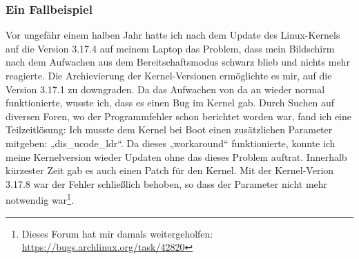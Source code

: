 \documentclass[a4paper,12pt]{article}
\begin{document}
\subsubsection{Ein Fallbeispiel}
Vor ungefähr einem halben Jahr hatte ich nach dem Update des Linux-Kernels auf die Version 3.17.4 auf meinem Laptop das Problem, dass mein Bildschirm nach dem Aufwachen aus dem Bereitschaftsmodus schwarz blieb und nichts mehr reagierte. Die Archievierung der Kernel-Versionen ermöglichte es mir, auf die Version 3.17.1 zu downgraden. Da das Aufwachen von da an wieder normal funktionierte, wusste ich, dass es einen Bug im Kernel gab. Durch Suchen auf diversen Foren, wo der Programmfehler schon berichtet worden war, fand ich eine Teilzeitlösung: Ich musste dem Kernel bei Boot einen zusätzlichen Parameter mitgeben: „dis\_ucode\_ldr“. Da dieses „workaround“ funktionierte, konnte ich meine Kernelversion wieder Updaten ohne das dieses Problem auftrat. Innerhalb kürzester Zeit gab es auch einen Patch für den Kernel. Mit der Kernel-Verion 3.17.8 war der Fehler schließlich behoben, so dass der Parameter nicht mehr notwendig war\footnote{Dieses Forum hat mir damals weitergeholfen: \url{https://bugs.archlinux.org/task/42820}}.
\end{document}
